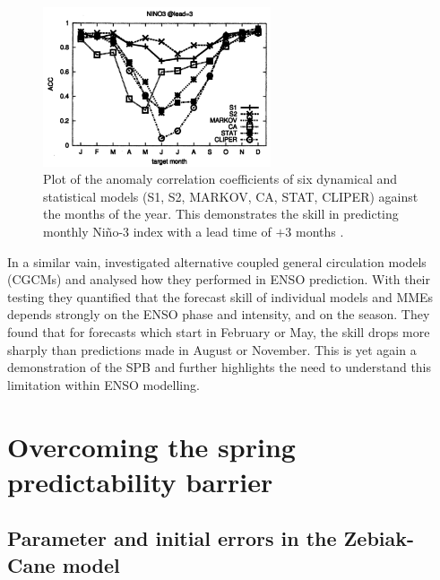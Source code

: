 \documentclass[12pt, onecolumn]{revtex4}    %
\begin{document}
\begin{figure}
\includegraphics[width=0.6\textwidth]{data/ecmwf_data}
\caption[Persistence]{Plot of the anomaly correlation coefficients of six dynamical and statistical models (S1, S2, MARKOV, CA, STAT, CLIPER) against the months of the year. This demonstrates the skill in predicting monthly Ni\~{n}o-3 index with a lead time of $+3$ months \citep{jan2005did}.}
\label{fig:ecmwf_plot}
\end{figure}

In a similar vain, \cite{jin2008current} investigated alternative coupled general circulation models (CGCMs) and analysed how they performed in ENSO prediction. With their testing they quantified that the forecast skill of individual models and MMEs depends strongly on the ENSO phase and intensity, and on the season. They found that for forecasts which start in February or May, the skill drops more sharply than predictions made in August or November. This is yet again a demonstration of the SPB and further highlights the need to understand this limitation within ENSO modelling.

\section{Overcoming the spring predictability barrier}

\subsection{Parameter and initial errors in the Zebiak-Cane model}
\end{document}
